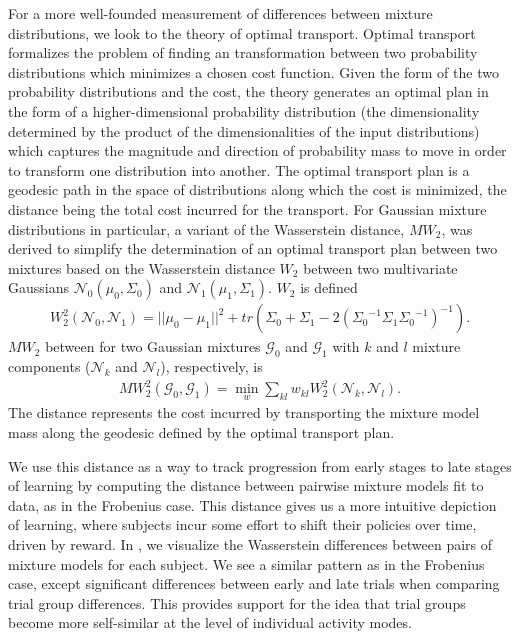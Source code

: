 \documentclass[../main.tex]{subfiles}
\begin{document}
For a more well-founded measurement of differences between mixture distributions, we look to the theory of optimal transport. Optimal transport formalizes the problem of finding an transformation between two probability distributions which minimizes a chosen cost function. Given the form of the two probability distributions and the cost, the theory generates an optimal plan in the form of a higher-dimensional probability distribution (the dimensionality determined by the product of the dimensionalities of the input distributions) which captures the magnitude and direction of probability mass to move in order to transform one distribution into another. The optimal transport plan is a geodesic path in the space of distributions along which the cost is minimized, the distance being the total cost incurred for the transport. For Gaussian mixture distributions in particular, a variant of the Wasserstein distance, $MW_2$, was derived to simplify the determination of an optimal transport plan between two mixtures based on the Wasserstein distance $W_2$ between two multivariate Gaussians $\mathcal{N}_0(\mu_0,\Sigma_0)$ and $\mathcal{N}_1(\mu_1,\Sigma_1)$\cite{delonWassersteintypeDistanceSpace2020}. $W_2$ is defined
%
\begin{align}
  W_2^2(\mathcal{N}_0,\mathcal{N}_1) = ||\mu_0-\mu_1||^2 + tr{(\Sigma_0 + \Sigma_1 - 2( {\Sigma_0}^{-1} \Sigma_1 {\Sigma_0}^{-1} )^{-1})}.
\end{align}
%
$MW_2$ between for two Gaussian mixtures $\mathcal{G}_0$ and $\mathcal{G}_1$ with $k$ and $l$ mixture components ($\mathcal{N}_k$ and $\mathcal{N}_l$), respectively, is
%
\begin{align}
  MW_2^2(\mathcal{G}_0,\mathcal{G}_1) = \min_{w}\sum_{kl}{w_{kl}W_2^2(\mathcal{N}_k,\mathcal{N}_l)}.
\end{align}
%
The distance represents the cost incurred by transporting the mixture model mass along the geodesic defined by the optimal transport plan. 

We use this distance as a way to track progression from early stages to late stages of learning by computing the distance between pairwise mixture models fit to data, as in the Frobenius case. This distance gives us a more intuitive depiction of learning, where subjects incur some effort to shift their policies over time, driven by reward. In , we visualize the Wasserstein differences between pairs of mixture models for each subject. We see a similar pattern as in the Frobenius case, except significant differences between early and late trials when comparing trial group differences. This provides support for the idea that trial groups become more self-similar at the level of individual activity modes. 
\end{document}
